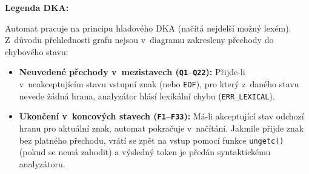 \documentclass[]{ifjclass}
\begin{document}
        \noindent\textbf{Legenda DKA:}\par\medskip
        \noindent Automat pracuje na principu hladového DKA (načítá nejdelší možný lexém). Z~důvodu přehlednosti grafu nejsou v~diagramu zakresleny přechody do chybového stavu:
        \begin{itemize}\setlength{\itemsep}{2pt}\setlength{\parskip}{0pt}
            \item \textbf{Neuvedené přechody v~mezistavech (\texttt{Q1}--\texttt{Q22}):} Přijde-li v~neakceptujícím stavu vstupní znak (nebo \texttt{EOF}), pro který z~daného stavu nevede žádná hrana, analyzátor hlásí lexikální chybu (\texttt{ERR\_LEXICAL}).
            \item \textbf{Ukončení v~koncových stavech (\texttt{F1}--\texttt{F33}):} Má-li akceptující stav odchozí hranu pro aktuální znak, automat pokračuje v~načítání. Jakmile přijde znak bez platného přechodu, vrátí se zpět na vstup pomocí funkce \texttt{ungetc()} (pokud se nemá zahodit) a výsledný token je předán syntaktickému analyzátoru.
        \end{itemize}
        \medskip
        \noindent
\end{document}
